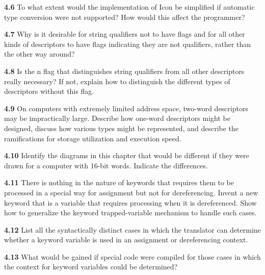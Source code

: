 \noindent\textbf{4.6} To what extent would the implementation of Icon
be simplified if automatic type conversion were not supported? How
would this affect the programmer?

\noindent\textbf{4.7} Why is it desirable for string qualifiers not to have
flags and for all other kinds of descriptors to have flags indicating they
are not qualifiers, rather than the other way around?

\noindent\textbf{4.8} Is the n flag that distinguishes string qualifiers
from all other descriptors really necessary? If not, explain how to
distinguish the different types of descriptors without this flag.

\noindent\textbf{4.9} On computers with extremely limited address
space, two-word descriptors may be impractically large. Describe how
one-word descriptors might be designed, discuss how various types
might be represented, and describe the ramifications for storage
utilization and execution speed.

\noindent\textbf{4.10} Identify the diagrams in this chapter that
would be different if they were drawn for a computer with 16-bit
words.  Indicate the differences.

\noindent\textbf{4.11} There is nothing in the nature of keywords that
requires them to be processed in a special way for assignment but not
for dereferencing. Invent a new keyword that is a variable that
requires processing when it is dereferenced. Show how to generalize
the keyword trapped-variable mechanism to handle such cases.

\noindent\textbf{4.12} List all the syntactically distinct cases in which the
translator can determine whether a keyword variable is used in an
assignment or dereferencing context.

\noindent\textbf{4.13} What would be gained if special code were compiled for
those cases in which the context for keyword variables could be determined?
